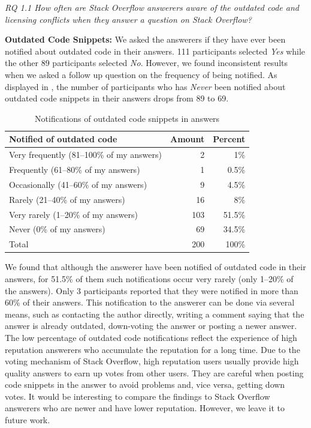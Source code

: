 \documentclass[10pt,journal,compsoc]{IEEEtran}
\begin{document}
\vspace{0.25cm}
\textit{RQ 1.1 How often are Stack Overflow
	answerers aware of the outdated code and 
	licensing conflicts when
	they answer a question on Stack Overflow?} 
\vspace{0.25cm}

\textbf{Outdated Code Snippets:} We asked the answerers if they have ever been notified about outdated code in
their answers. 111 participants selected \textit{Yes} while the other 89 participants
selected \textit{No}. However, we found inconsistent results when we asked a follow up
question on the frequency of being notified. As displayed in
, the number of participants who has
\textit{Never} been notified about outdated code snippets in their answers drops
from 89 to 69.

\begin{table}
	\centering
	\caption{Notifications of outdated code snippets in answers}
	\label{tab:survey_code_snippet_outdated}
	\begin{tabular}{lrr}
		\toprule
		Notified of outdated code & Amount & Percent \\
		\midrule
		Very frequently (81--100\% of my answers) & 2 & 1\% \\
		Frequently (61--80\% of my answers) & 1 & 0.5\% \\
		Occasionally (41--60\% of my answers) & 9 & 4.5\% \\
		Rarely (21--40\% of my answers) & 16 & 8\% \\
		Very rarely (1--20\% of my answers) & 103 & 51.5\% \\
		Never (0\% of my answers) & 69 & 34.5\% \\
		\midrule
		Total & 200 & 100\% \\
		\bottomrule
	\end{tabular}
\end{table}

We found that although the answerer have been notified of outdated code in their
answers, for 51.5\% of them such notifications occur very rarely (only 1--20\%
of the answers). Only 3 participants reported that they were notified in more
than 60\% of their answers. This notification to the answerer can be done 
via several means, such as contacting the author directly, 
writing a comment saying that the answer is
already outdated, down-voting the answer or posting a newer answer.
The low percentage of outdated code notifications
reflect the experience of high reputation answerers who accumulate the reputation for a
long time. Due to the voting mechanism of Stack Overflow, high reputation users
usually provide high quality answers to earn up votes from other users. They are
careful when posting code snippets in the answer to avoid problems and, vice versa, 
getting down votes. It would be interesting to compare the findings to
Stack Overflow answerers who are newer and have lower reputation. However, we
leave it to future work.
\end{document}
